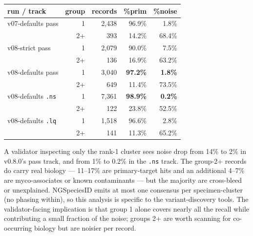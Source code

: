 \documentclass[11pt]{article}
\begin{document}
\begin{center}
\begin{tabular}{lrrrr}
\toprule
run / track & group & records & \%prim & \%noise \\
\midrule
v07-defaults pass         & 1   & 2,438 & 96.9\% &  1.8\% \\
                          & 2+  &   393 & 14.2\% & 68.4\% \\
v08-strict pass           & 1   & 2,079 & 90.0\% &  7.5\% \\
                          & 2+  &   136 & 16.9\% & 63.2\% \\
v08-defaults pass         & 1   & 3,040 & \textbf{97.2\%} &  \textbf{1.8\%} \\
                          & 2+  &   649 & 11.4\% & 73.5\% \\
v08-defaults \texttt{.ns} & 1   & 7,361 & \textbf{98.9\%} &  \textbf{0.2\%} \\
                          & 2+  &   122 & 23.8\% & 52.5\% \\
v08-defaults \texttt{.lq} & 1   & 1,518 & 96.6\% &  2.8\% \\
                          & 2+  &   141 & 11.3\% & 65.2\% \\
\bottomrule
\end{tabular}
\end{center}

A validator inspecting only the rank-1 cluster sees noise drop from
14\% to 2\% in v0.8.0's pass track, and from 1\% to 0.2\% in the
\texttt{.ns} track. The group-2+ records do carry real biology ---
11--17\% are primary-target hits and an additional 4--7\% are
myco-associates or known contaminants --- but the majority are
cross-bleed or unexplained. NGSpeciesID emits at most one consensus
per specimen-cluster (no phasing within), so this analysis is specific
to the variant-discovery tools. The validator-facing implication is
that group 1 alone covers nearly all the recall while contributing a
small fraction of the noise; groups 2+ are worth scanning for
co-occurring biology but are noisier per record.
\end{document}
